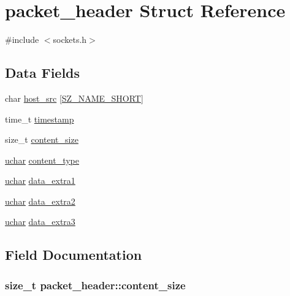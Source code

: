 \hypertarget{structpacket__header}{}\section{packet\+\_\+header Struct Reference}
\label{structpacket__header}


{\ttfamily \#include $<$sockets.\+h$>$}

\subsection*{Data Fields}
\begin{DoxyCompactItemize}
\item 
char \hyperlink{structpacket__header_a0c97c66738660420de387adbd6225f44}{host\+\_\+src} \mbox{[}\hyperlink{sizes_8h_aa1539eb7e3aa7e9eb929e62cfb80e621}{S\+Z\+\_\+\+N\+A\+M\+E\+\_\+\+S\+H\+O\+RT}\mbox{]}
\item 
time\+\_\+t \hyperlink{structpacket__header_a4d204de563e35da6b3984aa98c74d67b}{timestamp}
\item 
size\+\_\+t \hyperlink{structpacket__header_a46bd03ed38794169ad75caa11598757f}{content\+\_\+size}
\item 
\hyperlink{generic_8h_a65f85814a8290f9797005d3b28e7e5fc}{uchar} \hyperlink{structpacket__header_aaf3da3a6f0e4d79f089b74e110da52f0}{content\+\_\+type}
\item 
\hyperlink{generic_8h_a65f85814a8290f9797005d3b28e7e5fc}{uchar} \hyperlink{structpacket__header_acc623e37adeca9c65db186a84428b9b7}{data\+\_\+extra1}
\item 
\hyperlink{generic_8h_a65f85814a8290f9797005d3b28e7e5fc}{uchar} \hyperlink{structpacket__header_a1cb6613afe1cd0de0a8ffac9edf8457f}{data\+\_\+extra2}
\item 
\hyperlink{generic_8h_a65f85814a8290f9797005d3b28e7e5fc}{uchar} \hyperlink{structpacket__header_af0cd2814f06559da7518c5c980717983}{data\+\_\+extra3}
\end{DoxyCompactItemize}


\subsection{Field Documentation}
\subsubsection[{\texorpdfstring{content\+\_\+size}{content_size}}]{\setlength{\rightskip}{0pt plus 5cm}size\+\_\+t packet\+\_\+header\+::content\+\_\+size}\hypertarget{structpacket__header_a46bd03ed38794169ad75caa11598757f}{}\label{structpacket__header_a46bd03ed38794169ad75caa11598757f}
